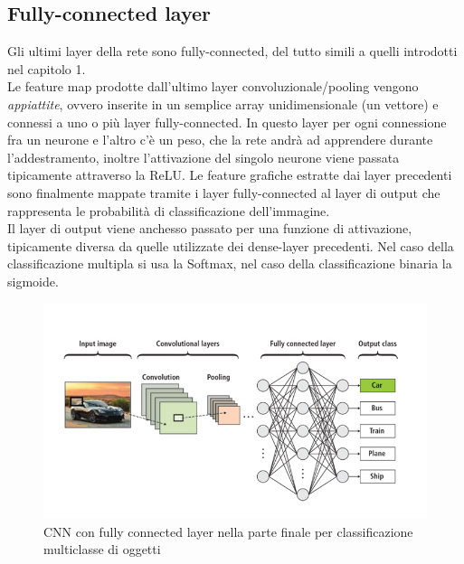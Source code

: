\documentclass[12pt,a4paper,openright,twoside]{report}
\begin{document}
\subsection{Fully-connected layer }
Gli ultimi layer della rete sono fully-connected, del tutto simili a quelli introdotti nel capitolo 1. \\
Le feature map prodotte dall'ultimo layer convoluzionale/pooling vengono \emph{appiattite}, ovvero inserite in un semplice array unidimensionale (un vettore) e connessi a uno o più layer fully-connected. In questo layer per ogni connessione fra un neurone e l'altro c'è un peso, che la rete andrà ad apprendere durante l'addestramento, inoltre l'attivazione del singolo neurone viene passata tipicamente attraverso la ReLU. Le feature grafiche estratte dai layer precedenti sono finalmente mappate tramite i layer fully-connected al layer di output che rappresenta le probabilità di classificazione dell'immagine.
\\Il layer di output viene anchesso passato per una funzione di attivazione, tipicamente diversa da quelle utilizzate dei dense-layer precedenti. Nel caso della classificazione multipla si usa la Softmax, nel caso della classificazione binaria la sigmoide.
\begin{figure}[h]
\centering
\includegraphics[width=\linewidth]{CNN_fully_connected.png}
\caption{CNN con fully connected layer nella parte finale per classificazione multiclasse di oggetti }
\end{figure}
\end{document}
